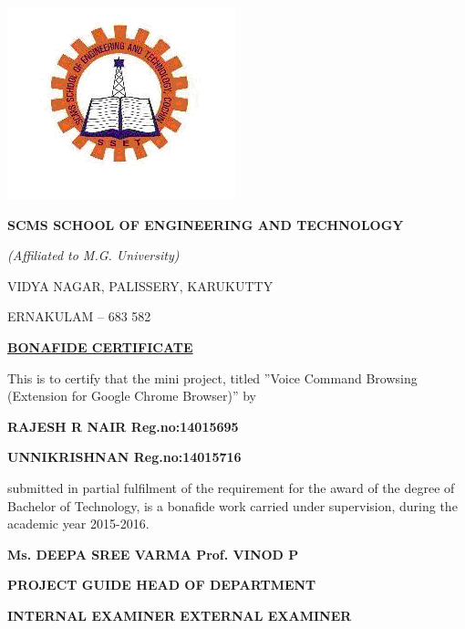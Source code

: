 \documentclass[11pt]{report} %
\begin{document}
	
	\thispagestyle{empty}
	\begin{center}
		\begin{minipage}{\linewidth}
			\centering
			\includegraphics[width=0.5\linewidth]{figures/logo.png}
			\vspace{1cm}
			\\
			
			{\Large \bf{SCMS SCHOOL OF ENGINEERING AND TECHNOLOGY}\par}
			{\Large \emph{(Affiliated to M.G. University)}\par}
			{\Large VIDYA NAGAR, PALISSERY, KARUKUTTY\par}
			{\Large ERNAKULAM – 683 582\par}
			\vspace{1cm}
			{\Large \bf{\underline{BONAFIDE CERTIFICATE}}\par}
			\vspace{0.5cm}
			\begin{flushleft}
				This is to certify that the mini project, titled ''Voice Command Browsing (Extension for Google Chrome  Browser)'' by
			\end{flushleft} 
			{ \bf{RAJESH R NAIR}\hspace{3cm}     Reg.no:14015695 \par}
			{ \bf{UNNIKRISHNAN}\hspace{3cm}      Reg.no:14015716 \par}
			\begin{flushleft}
				submitted in partial fulfilment of the requirement for the award of the degree of Bachelor of Technology, is a bonafide work carried under supervision, during the academic year 2015-2016.
			\end{flushleft}
		    \vspace{2cm}
			{ \bf{Ms. DEEPA SREE VARMA}\hspace{3.5cm}     Prof. VINOD P \par}
			{ \bf{PROJECT GUIDE}\hspace{3cm}      HEAD OF DEPARTMENT\par}
			
			\vspace{3cm}
			
			{ \bf{INTERNAL EXAMINER}\hspace{3cm}     EXTERNAL EXAMINER \par}
			
			
		\end{minipage}
	\end{center}
	\clearpage
	
\end{document}
